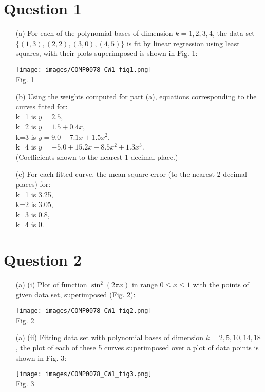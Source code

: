 \documentclass[a4paper,12pt]{article}
\begin{document}
\section*{Question 1}
\begin{enumerate}

\item[(a)] 
For each of the polynomial bases of dimension $k = 1,2,3,4$, the data set $\{(1, 3), (2, 2), (3, 0), (4, 5)\}$ is fit by linear regression using least squares, with their plots superimposed is shown in Fig. 1:

\texttt{[image: images/COMP0078\_CW1\_fig1.png]}\\
Fig. 1 \\
\item[(b)] Using the weights computed for part (a), equations corresponding to the curves fitted for: \\
k=1 is $y = 2.5$,\\
k=2 is $y = 1.5 + 0.4x$,\\
k=3 is $y = 9.0 - 7.1x + 1.5 x^2$,\\
k=4 is $y = -5.0 + 15.2x -8.5x^2 + 1.3x^3$.\\
(Coefficients shown to the nearest 1 decimal place.)
\item[(c)] 
For each fitted curve, the mean square error (to the nearest 2 decimal places) for:\\
k=1 is 3.25,\\
k=2 is 3.05,\\
k=3 is 0.8,\\
k=4 is 0.\\

\end{enumerate} 
\clearpage

\section*{Question 2}

\begin{enumerate}

\item[(a)](i) 
Plot of function $ \sin^{2}(2\pi x)$ in range $0 \leq x \leq 1$ with the points of given data set, superimposed (Fig. 2):

\texttt{[image: images/COMP0078\_CW1\_fig2.png]}\\
Fig. 2 \\

\item[(a)](ii) 
Fitting data set with polynomial bases of dimension $k = 2, 5, 10, 14, 18$, the plot of each of these 5 curves superimposed over a plot of data points is shown in Fig. 3:

\texttt{[image: images/COMP0078\_CW1\_fig3.png]}\\
Fig. 3 \\
\end{enumerate} 
\clearpage
\end{document}
